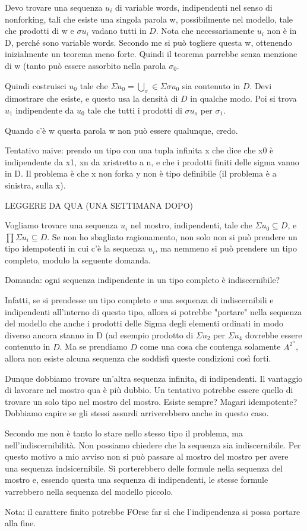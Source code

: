 \documentclass{article}
\begin{document}
Devo trovare una sequenza $u_i$ di variable words, indipendenti nel senso di nonforking, tali che esiste una singola parola w, possibilmente nel modello, tale che prodotti di w e $\sigma u_i$ vadano tutti in $D$. Nota che necessariamente $u_i$ non è in D, perché sono variable words. Secondo me si può togliere questa w, ottenendo inizialmente un teorema meno forte. Quindi il teorema parrebbe senza menzione di w (tanto può essere assorbito nella parola $\sigma_0$.

Quindi costruisci $u_0$ tale che $\Sigma{u_0}=\bigcup_\sigma\in \Sigma \sigma u_0$ sia contenuto in $D$. Devi dimostrare che esiste, e questo usa la densità di $D$ in qualche modo. Poi si trova $u_1$ indipendente da $u_0$ tale che tutti i prodotti di $\sigma u_o$ per $\sigma_1$.

Quando c'è w questa parola w non può essere qualunque, credo. 

Tentativo naive: prendo un tipo con una tupla infinita x che dice che x0 è indipendente da x1, xn da xristretto a n, e che i prodotti finiti delle sigma vanno in D. Il problema è che x non forka y non è tipo definibile (il problema è a sinistra, sulla x). 

LEGGERE DA QUA (UNA SETTIMANA DOPO)

Vogliamo trovare una sequenza $u_i$ nel mostro, indipendenti, tale che $\Sigma u_0\subseteq D$, e $\prod \Sigma u_i\subseteq D$. Se non ho sbagliato ragionamento, non solo non si può prendere un tipo idempotenti in cui c'è la sequenza $u_i$, ma nemmeno si può prendere un tipo completo, modulo la seguente domanda.

Domanda: ogni sequenza indipendente in un tipo completo è indiscernibile?

Infatti, se si prendesse un tipo completo e una sequenza di indiscernibili e indipendenti all'interno di questo tipo, allora si potrebbe "portare" nella sequenza del modello che anche i prodotti delle Sigma degli elementi ordinati in modo diverso ancora stanno in D (ad esempio prodotto di $\Sigma u_2 $ per $\Sigma u_4$ dovrebbe essere contenuto in $D$. Ma se prendiamo $D$ come una cosa che contenga solamente $\displaystyle A^{2^n}$, allora non esiste alcuna sequenza che soddisfi queste condizioni così forti. 

Dunque dobbiamo trovare un'altra sequenza infinita, di indipendenti. Il vantaggio di lavorare nel mostro qua è più dubbio. Un tentativo potrebbe essere quello di trovare un solo tipo nel mostro del mostro. Esiste sempre? Magari idempotente?
Dobbiamo capire se gli stessi assurdi arriverebbero anche in questo caso.

Secondo me non è tanto lo stare nello stesso tipo il problema, ma nell'indiscernibilità. Non possiamo chiedere che la sequenza sia indiscernibile. Per questo motivo a mio avviso non si può passare al mostro del mostro per avere una sequenza indsicernibile. Si porterebbero delle formule nella sequenza del mostro e, essendo questa una sequenza di indipendenti, le stesse formule varrebbero nella sequenza del modello piccolo.

Nota: il carattere finito potrebbe FOrse far sì che l'indipendenza si possa portare alla fine.
\end{document}
